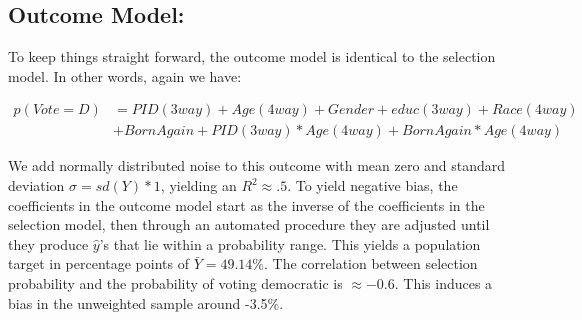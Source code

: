 \documentclass[
]{article}
\begin{document}
\hypertarget{outcome-model}{%
\subsection{Outcome Model:}\label{outcome-model}}

To keep things straight forward, the outcome model is identical to the
selection model. In other words, again we have:

\begin{align*}
p(Vote=D) &= PID(3way) + Age(4way)+ Gender + educ(3way) + Race(4way) \\
&+ BornAgain + PID(3way)*Age(4way) + BornAgain*Age(4way)
\end{align*}

We add normally distributed noise to this outcome with mean zero and
standard deviation \(\sigma = sd(Y)*1\), yielding an \(R^2\approx.5\).
To yield negative bias, the coefficients in the outcome model start as
the inverse of the coefficients in the selection model, then through an
automated procedure they are adjusted until they produce \(\hat{y}\)'s
that lie within a probability range. This yields a population target in
percentage points of \(\bar{Y} =49.14\%\). The correlation between
selection probability and the probability of voting democratic is
\(\approx -0.6\). This induces a bias in the unweighted sample around
-3.5\%.
\end{document}
